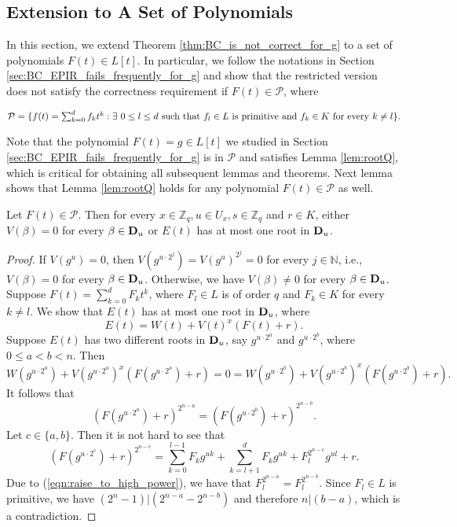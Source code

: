 \documentclass[JMC]{degruyter-journal}
\begin{document}
\subsection{Extension to A Set of Polynomials}

In this section, we extend Theorem \ref{thm:BC_is_not_correct_for_g}
to a set of polynomials
 $F(t)\in L[t]$. In particular, we follow the notations in Section \ref{sec:BC_EPIR_fails_frequently_for_g} and
  show that the restricted version   does not satisfy the correctness requirement
if  $F(t)\in \mathcal{P}$, where
\begin{center}
$ \mathcal{P}=\{f(t)=\sum_{k=0}^{d}f_kt^k: \exists~ 0\leq l\leq
d{\rm ~such~that~}f_{l}\in L {\rm~is~primitive}
{\rm~and~}f_k\in K{\rm ~for~every~}k\neq l\}. $
\end{center}
Note that the polynomial $F(t)=g\in L[t]$ we studied in Section
\ref{sec:BC_EPIR_fails_frequently_for_g} is in
$\mathcal{P}$ and satisfies Lemma \ref{lem:rootQ}, which is critical
for obtaining all subsequent  lemmas and theorems.
 Next lemma shows that Lemma \ref{lem:rootQ} holds for any polynomial
$F(t)\in \mathcal{P}$ as well.
\begin{lemma}\label{lem:F_t_in_POLY_are_good}
Let  $F(t)\in \mathcal{P}$. Then for every $x\in \mathbb{Z}_q, u\in
U_x, s\in \mathbb{Z}_q$ and $ r\in K$, either $V(\beta)=0$ for every
$\beta\in {\bf D}_u$ or $E(t)$ has at most one root in ${\bf D}_u$.
\end{lemma}

\begin{proof}
If $V(g^u)=0$, then $V(g^{u\cdot 2^j})=V(g^u)^{2^j}=0$ for every
$j\in \mathbb{N}$, i.e., $V(\beta)=0$ for every $\beta\in {\bf
D}_u$. Otherwise, we have $V(\beta)\neq 0$ for every $\beta\in {\bf
D}_u$. Suppose
 $F(t)=\sum_{k=0}^d F_k t^k$, where $F_{l}\in L$ is of order $q$ and
 $F_k\in K$ for every $k\neq l$. We show that $E(t)$ has at most one root in ${\bf D}_u$, where
 $$E(t)=W(t)+V(t)^x(F(t)+r).$$
Suppose $E(t)$ has two different roots in ${\bf D}_u$, say $g^{u\cdot 2^a}$ and $g^{u\cdot 2^b}$,
where $0\leq a<b<n$. Then
$$W(g^{u\cdot 2^a})+V(g^{u\cdot 2^a})^x(F(g^{u\cdot 2^a})+r)
=0=W(g^{u\cdot 2^b})+V(g^{u\cdot 2^b})^x(F(g^{u\cdot 2^b})+r).$$ It
follows that
\begin{equation}\label{eqn:raise_to_high_power}
(F(g^{u\cdot 2^a})+r)^{2^{n-a}}=(F(g^{u\cdot 2^b})+r)^{2^{n-b}}.
\end{equation}
Let $c\in \{a,b\}$. Then it is not hard to see that
$$(F(g^{u\cdot 2^c})+r)^{2^{n-c}}=
\sum_{k=0}^{l-1}F_k g^{uk}+\sum_{k=l+1}^{d}F_k
g^{uk}+F_{l}^{2^{n-c}}g^{ul}+r.$$ Due to
(\ref{eqn:raise_to_high_power}), we have that
$F_{l}^{2^{n-a}}=F_{l}^{2^{n-b}}.$
Since $F_{l}\in L$ is primitive, we have
$(2^n-1)|(2^{n-a}-2^{n-b})$ and therefore $n|(b-a)$, which  is a
contradiction.
\end{proof}
\end{document}
